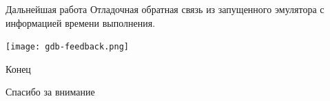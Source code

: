 \documentclass[unicode,hyperref={unicode=true}]{beamer}
\theoremstyle{definition}
\theoremstyle{plain}
\begin{document}
\begin{frame}{Дальнейшая работа}
Отладочная обратная связь из запущенного эмулятора с информацией времени
выполнения.
\vfill
\begin{center}
\texttt{[image: gdb-feedback.png]}
\end{center}
\end{frame}



\begin{frame}{Конец}
\begin{center}
Спасибо за внимание
\end{center}
\end{frame}
\end{document}
